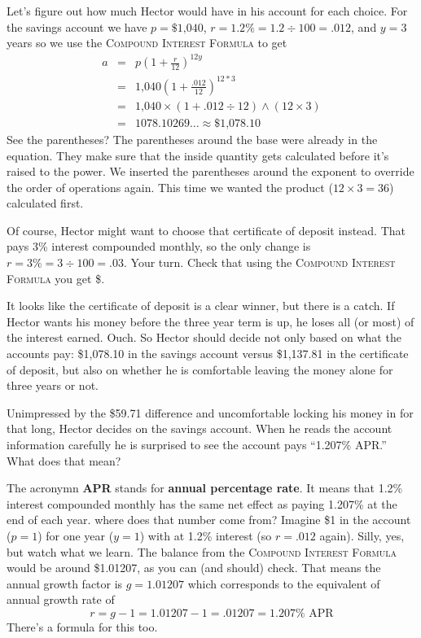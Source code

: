 Let's figure out how much Hector would have in his account for each choice.  For the savings account we have $p=\$\text{1,040}$, $r=1.2\% = 1.2 \div 100 = .012$, and $y = 3$ years so we use the \textsc{Compound Interest Formula} to get
\begin{eqnarray*}
a & = &  p \left( 1 + \frac{r}{12}\right) ^{12y}\\
& = &   \text{1,040} \left( 1 + \frac{.012}{12}\right) ^{12\ast 3}\\
& =  &  \text{1,040} \times ( 1 + .012 \div 12 ) \wedge (12 \times 3) \\
& =  & 1078.10269\ldots  \approx \$\text{1,078.10} 
\end{eqnarray*}
See the parentheses?  The parentheses around the base were already in the equation.  They make sure that the inside quantity gets calculated before it's raised to the power.  We inserted the parentheses around the exponent to override the order of operations again.  This time we wanted the product ($12 \times 3=36$) calculated first.  

Of course, Hector might want to choose that certificate of deposit instead.  That pays 3\% interest compounded monthly, so the only change is  $r=3\% = 3 \div 100 = .03$.  Your turn.  Check that using the \textsc{Compound Interest Formula} you get \$.

It looks like the certificate of deposit is a clear winner, but there is a catch.  If Hector wants his money before the three year term is up, he loses all (or most) of the interest earned. Ouch.  So Hector should decide not only based on what the accounts pay: \$1,078.10 in the savings account versus \$1,137.81 in the certificate of deposit, but also on whether he is comfortable leaving the money alone for three years or not.

Unimpressed by the \$59.71 difference and uncomfortable locking his money in for that long, Hector decides on the savings account. When he reads the account information carefully he is surprised to see the account pays ``1.207\% APR.''  What does that mean?

The acronymn \textbf{APR} stands for \textbf{annual percentage rate}.  It means that 1.2\% interest compounded monthly has the same net effect as paying 1.207\% at the end of each year.  where does that number come from?  Imagine \$1 in the account  ($p=1$) for one year ($y=1$) with at 1.2\% interest (so $r=.012$ again).  Silly, yes, but watch what we learn.  
The balance from the \textsc{Compound Interest Formula} would be around \$1.01207, as you can (and should) check.
That means the annual growth factor is $g=1.01207$ which corresponds to the equivalent of annual growth rate of $$r=g-1=1.01207-1 = .01207 = 1.207\% \text{ APR}$$  There's a formula for this too.

